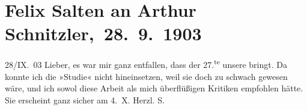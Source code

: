 

         
         \renewcommand{\erwaehntePersonen}{Personen: Felix Salten}
         \renewcommand{\erwaehnteInstitutionen}{Institutionen: Die Zeit}
         \renewcommand{\erwaehnteOrte}{Orte: Wien}
         \renewcommand{\erwaehnteWerke}{Werke: Die Zeit, Studie}
               \section[ Felix Salten an Arthur Schnitzler, 28. 9. 1903]{ Felix Salten an Arthur Schnitzler, 28. 9. 1903}\nopagebreak{}\rehead{ }\begin{ledgroupsized}[t]{13cm}\normalsize\beginnumbering \toendnotes[C]{\smallbreak\pagebreak[2]} 
\toendnotes[C]{\smallbreak}\pstart
           \raggedleft{}{\pb}28/IX. 03\pend
           \pstart
           Lieber, es war mir ganz entfallen, dass der 27.\textsuperscript{te} unsere \label{K_L03345-1v}\label{K_L03345-1h} bringt. Da
               konnte ich die »Studie« nicht hineinsetzen, weil
               sie doch zu schwach gewesen wäre, und ich sowol diese Arbeit als mich überflüßigen Kritiken empfohlen hätte. Sie
               erscheint ganz sicher am 4. X.\pend
           \pstart Herzl. \spacefill\mbox{S.}\pend{}
         
         \endnumbering{}\end{ledgroupsized}  \newcommand{\dateiname}{L03345}\newcommand{\titel}{Felix Salten an Arthur Schnitzler, 28. 9. 1903}\newcommand{\editorInnen}{Martin Anton Müller und Laura Untner}
      